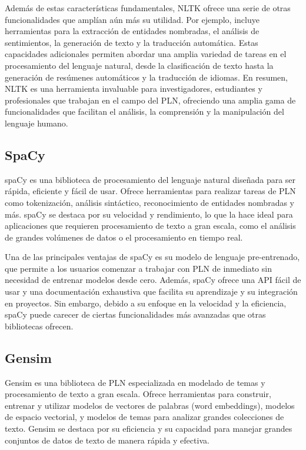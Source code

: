 Además de estas características fundamentales, NLTK ofrece una serie de otras funcionalidades que amplían aún más su utilidad. Por ejemplo, incluye herramientas para la extracción de entidades nombradas, el análisis de sentimientos, la generación de texto y la traducción automática. Estas capacidades adicionales permiten abordar una amplia variedad de tareas en el procesamiento del lenguaje natural, desde la clasificación de texto hasta la generación de resúmenes automáticos y la traducción de idiomas. En resumen, NLTK es una herramienta invaluable para investigadores, estudiantes y profesionales que trabajan en el campo del PLN, ofreciendo una amplia gama de funcionalidades que facilitan el análisis, la comprensión y la manipulación del lenguaje humano.


\subsection{SpaCy}

spaCy es una biblioteca de procesamiento del lenguaje natural diseñada para ser rápida, eficiente y fácil de usar. Ofrece herramientas para realizar tareas de PLN como tokenización, análisis sintáctico, reconocimiento de entidades nombradas y más. spaCy se destaca por su velocidad y rendimiento, lo que la hace ideal para aplicaciones que requieren procesamiento de texto a gran escala, como el análisis de grandes volúmenes de datos o el procesamiento en tiempo real.

Una de las principales ventajas de spaCy es su modelo de lenguaje pre-entrenado, que permite a los usuarios comenzar a trabajar con PLN de inmediato sin necesidad de entrenar modelos desde cero. Además, spaCy ofrece una API fácil de usar y una documentación exhaustiva que facilita su aprendizaje y su integración en proyectos. Sin embargo, debido a su enfoque en la velocidad y la eficiencia, spaCy puede carecer de ciertas funcionalidades más avanzadas que otras bibliotecas ofrecen.

\subsection{Gensim}

Gensim es una biblioteca de PLN especializada en modelado de temas y procesamiento de texto a gran escala. Ofrece herramientas para construir, entrenar y utilizar modelos de vectores de palabras (word embeddings), modelos de espacio vectorial, y modelos de temas para analizar grandes colecciones de texto. Gensim se destaca por su eficiencia y su capacidad para manejar grandes conjuntos de datos de texto de manera rápida y efectiva.

